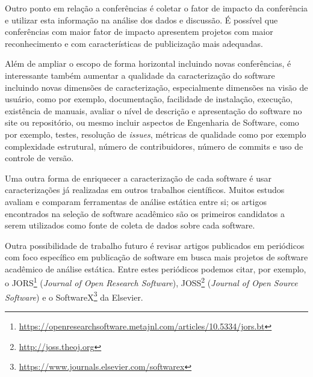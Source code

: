 

Outro ponto em relação a conferências é coletar o fator de impacto da
conferência e utilizar esta informação na análise dos dados e discussão. É
possível que conferências com maior fator de impacto apresentem projetos com
maior reconhecimento e com características de publicização mais adequadas.

Além de ampliar o escopo de forma horizontal incluindo novas conferências, é
interessante também aumentar a qualidade da caracterização do software
incluindo novas dimensões de caracterização, especialmente dimensões na visão
de usuário, como por exemplo, documentação, facilidade de instalação, execução,
existência de manuais, avaliar o nível de descrição e apresentação do software
no site ou repositório, ou mesmo incluir aspectos de Engenharia de Software,
como por exemplo, testes, resolução de {\it issues}, métricas de qualidade como
por exemplo complexidade estrutural, número de contribuidores, número de
commits e uso de controle de versão.


Uma outra forma de enriquecer a caracterização de cada software é usar
caracterizações já realizadas em outros trabalhos científicos. Muitos estudos
avaliam e comparam ferramentas de análise estática entre si; os artigos
encontrados na seleção de software acadêmico são os primeiros candidatos a
serem utilizados como fonte de coleta de dados sobre cada software.



Outra possibilidade de trabalho futuro é revisar artigos publicados em periódicos
com foco específico em publicação de software em busca mais projetos de
software acadêmico de análise estática. Entre estes periódicos podemos citar, por
exemplo, o JORS\footnote{\url{https://openresearchsoftware.metajnl.com/articles/10.5334/jors.bt}} ({\it Journal of Open Research
Software}),
JOSS\footnote{\url{http://joss.theoj.org}} ({\it Journal of Open Source Software}) \cite{smith2017journal} e
o SoftwareX\footnote{\url{https://www.journals.elsevier.com/softwarex}} da
Elsevier.

%
%
